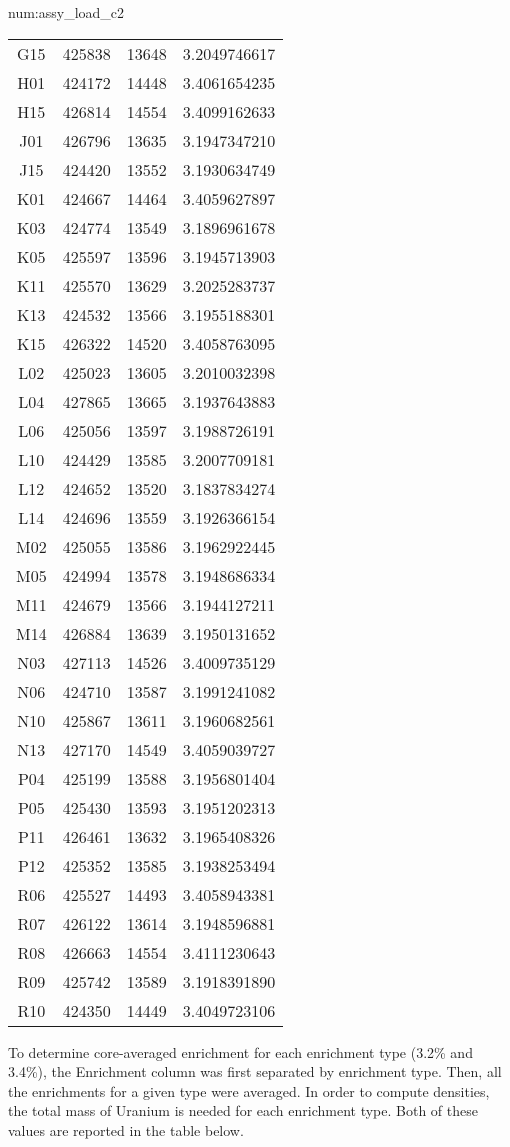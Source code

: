 \begin{numitem}{num:assy_load_c2}
\begin{center}
\begin{longtable}{c c c c}
G15&425838&13648&3.2049746617\\
H01&424172&14448&3.4061654235\\
H15&426814&14554&3.4099162633\\
J01&426796&13635&3.1947347210\\
J15&424420&13552&3.1930634749\\
K01&424667&14464&3.4059627897\\
K03&424774&13549&3.1896961678\\
K05&425597&13596&3.1945713903\\
K11&425570&13629&3.2025283737\\
K13&424532&13566&3.1955188301\\
K15&426322&14520&3.4058763095\\
L02&425023&13605&3.2010032398\\
L04&427865&13665&3.1937643883\\
L06&425056&13597&3.1988726191\\
L10&424429&13585&3.2007709181\\
L12&424652&13520&3.1837834274\\
L14&424696&13559&3.1926366154\\
M02&425055&13586&3.1962922445\\
M05&424994&13578&3.1948686334\\
M11&424679&13566&3.1944127211\\
M14&426884&13639&3.1950131652\\
N03&427113&14526&3.4009735129\\
N06&424710&13587&3.1991241082\\
N10&425867&13611&3.1960682561\\
N13&427170&14549&3.4059039727\\
P04&425199&13588&3.1956801404\\
P05&425430&13593&3.1951202313\\
P11&426461&13632&3.1965408326\\
P12&425352&13585&3.1938253494\\
R06&425527&14493&3.4058943381\\
R07&426122&13614&3.1948596881\\
R08&426663&14554&3.4111230643\\
R09&425742&13589&3.1918391890\\
R10&424350&14449&3.4049723106\\
    \bottomrule
  \end{longtable} \end{center}
  \raggedright
  To determine core-averaged enrichment for each enrichment type (3.2\% and 3.4\%), the Enrichment column was first separated by enrichment type. Then, all the enrichments for a given type were averaged. In order to compute densities, the total mass of Uranium is needed for each enrichment type. Both of these values are reported in the table below.

\end{numitem}
